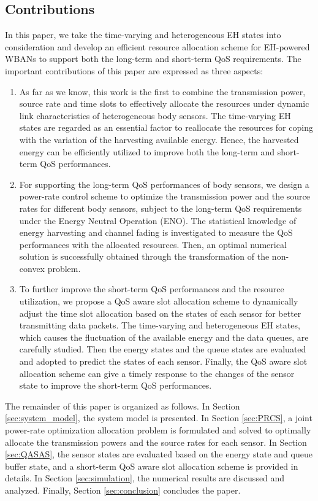 \documentclass[journal,10pt]{IEEEtran}
\begin{document}
\subsection{Contributions}
In this paper, we take the time-varying and heterogeneous EH states into consideration and develop an efficient resource allocation scheme for EH-powered WBANs to support both the long-term and short-term QoS requirements.
The important contributions of this paper are expressed as three aspects:
 \begin{enumerate}
	 \item As far as we know, this work is the first to combine the transmission power, source rate and time slots to effectively allocate the resources under dynamic link characteristics of heterogeneous body sensors. The time-varying EH states are regarded as an essential factor to reallocate the resources for coping with the variation of the harvesting available energy.
Hence, the harvested energy can be efficiently utilized to improve both the long-term and short-term QoS performances.
	 \item For supporting the long-term QoS performances of body sensors, we design a power-rate control scheme to optimize the transmission power and the source rates for different body sensors, subject to the long-term QoS requirements under the Energy Neutral Operation (ENO).
The statistical knowledge of energy harvesting and channel fading is investigated to measure the QoS performances with the allocated resources. Then, an optimal numerical solution is successfully obtained through the transformation of the non-convex problem. 
	\item To further improve the short-term QoS performances and the resource utilization, we propose a QoS aware slot allocation scheme to dynamically adjust the time slot allocation based on the states of each sensor for better transmitting data packets.
The time-varying and heterogeneous EH states, which causes the fluctuation of the available energy and the data queues, are carefully studied. Then the energy states and the queue states are evaluated and adopted to predict the states of each sensor. 
Finally, the QoS aware slot allocation scheme can give a timely response to the changes of the sensor state to improve the short-term QoS performances.

 \end{enumerate}
The remainder of this paper is organized as follows. 
In Section \ref{sec:system_model}, the system model is presented. In Section \ref{sec:PRCS}, a joint power-rate optimization allocation problem is formulated and solved to optimally allocate the transmission powers and the source rates for each sensor. 
In Section \ref{sec:QASAS}, the sensor states are evaluated based on the energy state and queue buffer state, and a short-term QoS aware slot allocation scheme is provided in details.
In Section \ref{sec:simulation}, the numerical results are discussed and analyzed. Finally, Section \ref{sec:conclusion} concludes the paper.
\end{document}
